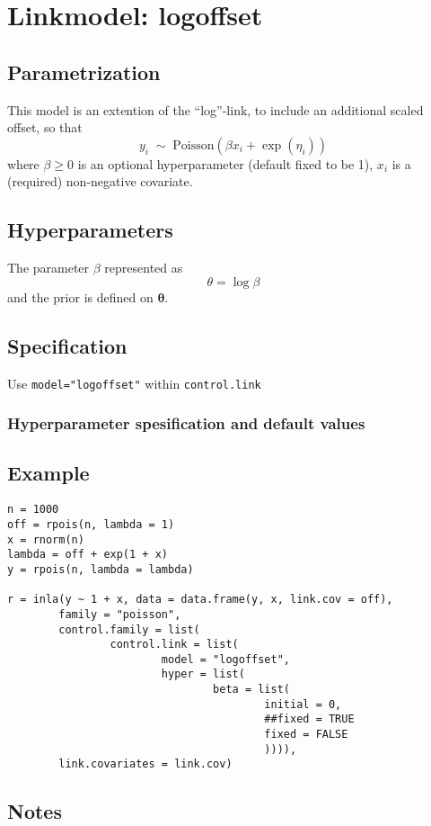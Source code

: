 \documentclass[a4paper,11pt]{article}
\begin{document}
\section*{Linkmodel: logoffset}

\subsection*{Parametrization}

This model is an extention of the ``log''-link, to include an
additional scaled offset, so that
\begin{displaymath}
    y_{i} \;\sim\; \text{Poisson}(\beta x_{i} + \exp(\eta_{i}))
\end{displaymath}
where $\beta \ge 0$ is an optional hyperparameter (default fixed to be 1),
$x_{i}$ is a (required) non-negative covariate.


\subsection*{Hyperparameters}

The  parameter $\beta$ represented as
\begin{displaymath}
    \theta =\log \beta
\end{displaymath}
and the prior is defined on $\mathbf{\theta}$.

\subsection*{Specification}

Use \texttt{model="logoffset"} within \texttt{control.link}

\subsubsection*{Hyperparameter spesification and default values}


\subsection*{Example}

\begin{verbatim}
n = 1000
off = rpois(n, lambda = 1)
x = rnorm(n)
lambda = off + exp(1 + x)
y = rpois(n, lambda = lambda)

r = inla(y ~ 1 + x, data = data.frame(y, x, link.cov = off),
        family = "poisson",
        control.family = list(
                control.link = list(
                        model = "logoffset", 
                        hyper = list(
                                beta = list(
                                        initial = 0, 
                                        ##fixed = TRUE
                                        fixed = FALSE
                                        )))), 
        link.covariates = link.cov)
\end{verbatim}


\subsection*{Notes}
\end{document}
